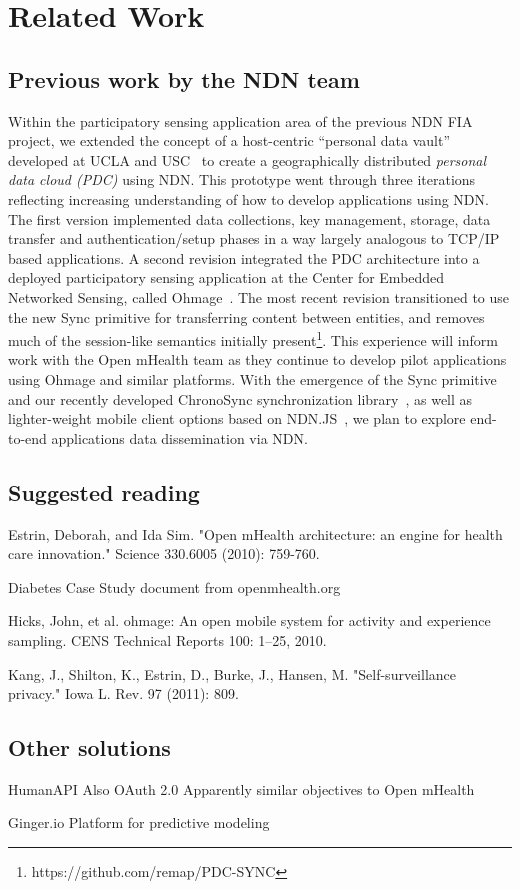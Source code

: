 \section{Related Work}

\subsection{Previous work by the NDN team}

Within the participatory sensing application area of the previous NDN
FIA project, we extended the concept of a host-centric ``personal data
vault'' developed at UCLA and USC~\cite{mun2010personal} to create a
geographically distributed \emph{personal data cloud (PDC)} using NDN.
This prototype went through three iterations reflecting increasing
understanding of how to develop applications using NDN.   The first
version implemented data collections, key management, storage, data
transfer and authentication/setup phases in a way largely analogous to
TCP/IP based applications.  A second revision integrated the PDC
architecture into a deployed participatory sensing application at the
Center for Embedded Networked Sensing, called
Ohmage~\cite{ramanathan2012ohmage}.
The most recent revision transitioned to use the
new Sync primitive for transferring content between entities, and removes
much of the session-like semantics initially
present\footnote{https://github.com/remap/PDC-SYNC}. This experience
will inform work with the Open mHealth team as they continue to develop
pilot applications using Ohmage and similar platforms. With the emergence
of the Sync primitive and our recently developed
ChronoSync synchronization library~\cite{Afanasyev13:CHRONOSYNC}, as well as lighter-weight mobile client
options based on NDN.JS~\cite{ndn-js-NOMEN}, we plan to explore end-to-end applications data dissemination via NDN.


\subsection{Suggested reading}

Estrin, Deborah, and Ida Sim. "Open mHealth architecture: an engine for health care innovation." Science 330.6005 (2010): 759-760.

Diabetes Case Study document from openmhealth.org 

Hicks, John, et al. ohmage: An open mobile system for activity and experience sampling. CENS Technical Reports 100: 1–25, 2010.

Kang, J., Shilton, K., Estrin, D., Burke, J., Hansen, M. "Self-surveillance privacy." Iowa L. Rev. 97 (2011): 809.

\subsection{Other solutions}

HumanAPI
Also OAuth 2.0
Apparently similar objectives to Open mHealth

Ginger.io
Platform for predictive modeling
